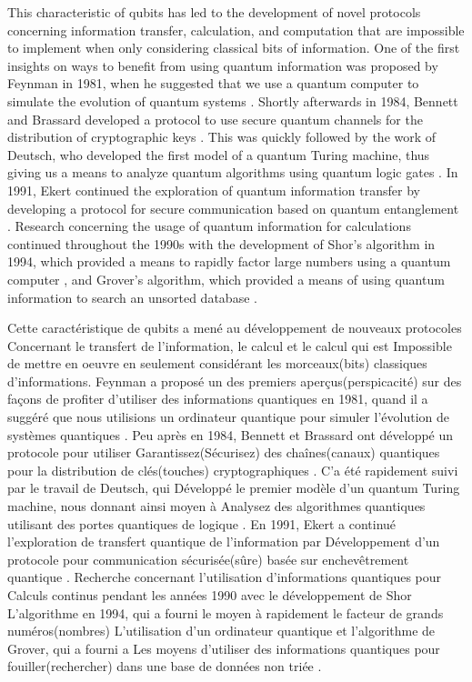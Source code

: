  
This characteristic of qubits has led to the development of novel protocols
concerning information transfer, calculation, and computation that are
impossible to implement when only considering classical bits of information.  One of the first insights on ways to benefit from using quantum information was proposed by Feynman in 1981, when he suggested that we use a quantum computer to simulate the evolution of quantum systems \cite{feynman1982simulating}.
Shortly afterwards in 1984, Bennett and Brassard developed a protocol to use
secure quantum channels for the distribution of cryptographic keys
\cite{Bennett84}.  This was quickly followed by the work of Deutsch, who
developed the first model of a quantum Turing machine, thus giving us a means to
analyze quantum algorithms using quantum logic gates \cite{Deutsch85}.
In 1991, Ekert continued the exploration of quantum information transfer by
developing a protocol for secure communication based on quantum entanglement
\cite{Ekert91}.  Research concerning the usage of quantum information for
calculations continued throughout the 1990s with the development of Shor's
algorithm in 1994, which provided a means to rapidly factor large numbers
using a quantum computer \cite{Shor94}, and Grover's algorithm, which provided a
means of using quantum information to search an unsorted database
\cite{Grover96}. 


Cette caractéristique de qubits a mené au développement de nouveaux protocoles
Concernant le transfert de l'information, le calcul et le calcul qui est
Impossible de mettre en oeuvre en seulement considérant les morceaux(bits) classiques d'informations. Feynman a proposé un des premiers aperçus(perspicacité) sur des façons de profiter d'utiliser des informations quantiques en 1981, quand il a suggéré que nous utilisions un ordinateur quantique pour simuler l'évolution de systèmes quantiques \cite {feynman1982simulating}.
Peu après en 1984, Bennett et Brassard ont développé un protocole pour utiliser
Garantissez(Sécurisez) des chaînes(canaux) quantiques pour la distribution de clés(touches) cryptographiques
\cite {Bennett84}. C'a été rapidement suivi par le travail de Deutsch, qui
Développé le premier modèle d'un quantum Turing machine, nous donnant ainsi moyen à
Analysez des algorithmes quantiques utilisant des portes quantiques de logique \cite {Deutsch85}.
En 1991, Ekert a continué l'exploration de transfert quantique de l'information par
Développement d'un protocole pour communication sécurisée(sûre) basée sur enchevêtrement quantique
\cite {Ekert91}.    Recherche concernant l'utilisation d'informations quantiques pour
Calculs continus pendant les années 1990 avec le développement de Shor
L'algorithme en 1994, qui a fourni le moyen à rapidement le facteur de grands numéros(nombres)
L'utilisation d'un ordinateur quantique \cite {Shor94} et l'algorithme de Grover, qui a fourni a
Les moyens d'utiliser des informations quantiques pour fouiller(rechercher) dans une base de données non triée
\cite {Grover96}. 


